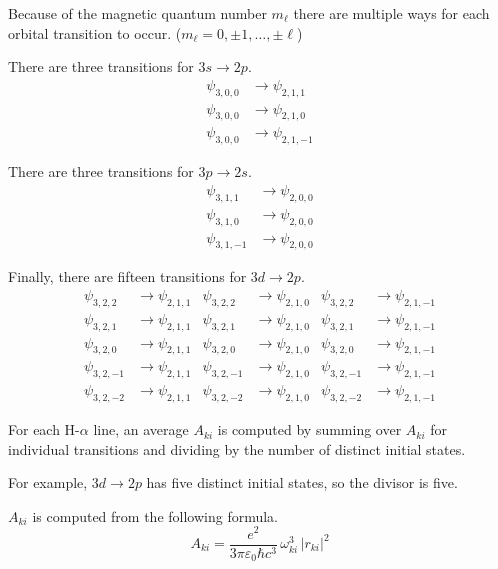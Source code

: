 \documentclass[12pt]{article}
\begin{document}
\noindent
Because of the magnetic quantum number $m_\ell$
there are multiple ways for each orbital transition to occur.
($m_\ell=0,\pm1,\ldots,\pm\ell$)

\bigskip
\noindent
There are three transitions for $3s\rightarrow2p$.
\begin{align*}
\psi_{3,0,0}&\rightarrow\psi_{2,1,1}
\\
\psi_{3,0,0}&\rightarrow\psi_{2,1,0}
\\
\psi_{3,0,0}&\rightarrow\psi_{2,1,-1}
\end{align*}

\noindent
There are three transitions for $3p\rightarrow2s$.
\begin{align*}
\psi_{3,1,1}&\rightarrow\psi_{2,0,0}
\\
\psi_{3,1,0}&\rightarrow\psi_{2,0,0}
\\
\psi_{3,1,-1}&\rightarrow\psi_{2,0,0}
\end{align*}

\noindent
Finally, there are fifteen transitions for $3d\rightarrow2p$.
\begin{align*}
\psi_{3,2,2}&\rightarrow\psi_{2,1,1} &
\psi_{3,2,2}&\rightarrow\psi_{2,1,0} &
\psi_{3,2,2}&\rightarrow\psi_{2,1,-1}
\\
\psi_{3,2,1}&\rightarrow\psi_{2,1,1} &
\psi_{3,2,1}&\rightarrow\psi_{2,1,0} &
\psi_{3,2,1}&\rightarrow\psi_{2,1,-1}
\\
\psi_{3,2,0}&\rightarrow\psi_{2,1,1} &
\psi_{3,2,0}&\rightarrow\psi_{2,1,0} &
\psi_{3,2,0}&\rightarrow\psi_{2,1,-1}
\\
\psi_{3,2,-1}&\rightarrow\psi_{2,1,1} &
\psi_{3,2,-1}&\rightarrow\psi_{2,1,0} &
\psi_{3,2,-1}&\rightarrow\psi_{2,1,-1}
\\
\psi_{3,2,-2}&\rightarrow\psi_{2,1,1} &
\psi_{3,2,-2}&\rightarrow\psi_{2,1,0} &
\psi_{3,2,-2}&\rightarrow\psi_{2,1,-1}
\end{align*}

\noindent
For each H-$\alpha$ line, an average $A_{ki}$ is computed by summing over $A_{ki}$ for individual transitions
and dividing by the number of distinct initial states.

\bigskip
\noindent
For example, $3d\rightarrow2p$ has five distinct initial states, so the divisor is five.

\bigskip
\noindent
$A_{ki}$ is computed from the following formula.
\begin{equation*}
A_{ki}=\frac{e^2}{3\pi\varepsilon_0\hbar c^3}\,\omega_{ki}^3\,|r_{ki}|^2
\end{equation*}
\end{document}
